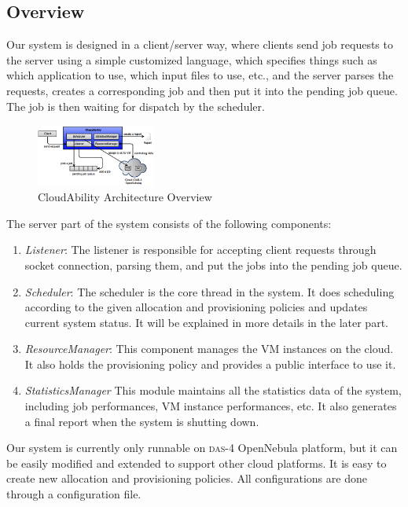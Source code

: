 \subsection{Overview}
Our system is designed in a client/server way, where clients send job
requests to the server using a simple customized language, which
specifies things such as which application to use, which input files
to use, etc., and the server parses the requests, creates a
corresponding job and then put it into the pending job queue. The job
is then waiting for dispatch by the scheduler.

\begin{figure}[!t]
\centering
\includegraphics[width=0.35\textwidth]{pictures/system-arch.png}
\caption{CloudAbility Architecture Overview}
\label{figure_system_arch}
\end{figure}

The server part of the system consists of the following components:

\begin{enumerate}
\item\emph{Listener}:
The listener is responsible for accepting client requests through
socket connection, parsing them, and put the jobs into the pending job
queue.
\item\emph{Scheduler}:
The scheduler is the core thread in the system. It does scheduling
according to the given allocation and provisioning policies and
updates current system status. It will be explained in more details in
the later part.
\item\emph{ResourceManager}: 
This component manages the VM instances on the cloud. It also holds the
provisioning policy and provides a public interface to use it.
\item\emph{StatisticsManager} 
This module maintains all the statistics data of the system, including
job performances, VM instance performances, etc. It also generates a
final report when the system is shutting down.
\end{enumerate}

Our system is currently only runnable on \textsc{das-4} OpenNebula
platform, but it can be easily modified and extended to support other
cloud platforms. It is easy to create new allocation and provisioning
policies. All configurations are done through a configuration file.



